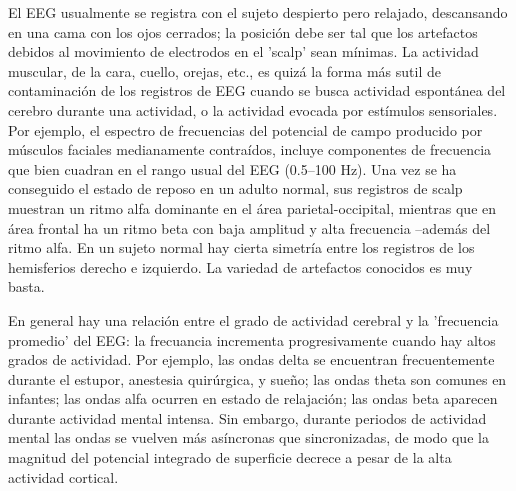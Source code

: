 El EEG usualmente se registra con el sujeto despierto pero relajado, descansando en una cama con 
los ojos cerrados; la posici\'on debe ser tal que los artefactos debidos al movimiento de 
electrodos en el 'scalp' sean m\'inimas. 
La actividad muscular, de la cara, cuello, orejas, etc., es quiz\'a la forma m\'as sutil de 
contaminaci\'on de los registros de EEG cuando se busca actividad espont\'anea del cerebro
durante una actividad, o la actividad evocada por est\'imulos sensoriales.
Por ejemplo, el espectro de frecuencias del potencial de campo producido por m\'usculos faciales
medianamente contra\'idos, incluye componentes de frecuencia que bien cuadran en el rango
usual del EEG (0.5--100 Hz).
Una vez se ha conseguido el estado de reposo en un adulto normal, sus registros de scalp
muestran un ritmo alfa dominante en el \'area parietal-occipital, mientras que en \'area
frontal ha un ritmo beta con baja amplitud y alta frecuencia --adem\'as del ritmo alfa.
En un sujeto normal hay cierta simetr\'ia entre los registros de los hemisferios derecho e 
izquierdo. 
La variedad de artefactos conocidos es muy basta.


En general hay una relaci\'on entre el grado de actividad cerebral
y la 'frecuencia promedio' del EEG: la frecuancia incrementa progresivamente cuando hay altos
grados de actividad. Por ejemplo, las ondas delta se encuentran frecuentemente durante el
estupor, anestesia quir\'urgica, y sue\~no; las ondas theta son comunes en infantes;
las ondas alfa ocurren en estado de relajaci\'on; las ondas beta aparecen durante actividad
mental intensa.
Sin embargo, durante periodos de actividad mental las ondas se vuelven m\'as as\'incronas
que sincronizadas, de modo que la magnitud del potencial integrado de superficie
decrece a pesar de la alta actividad cortical.

